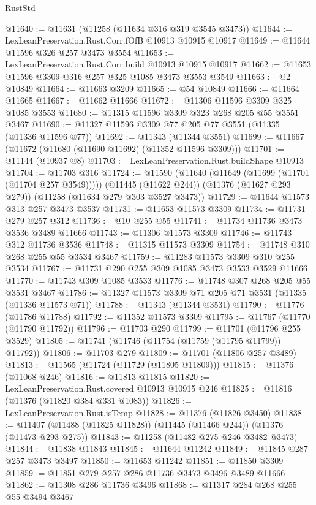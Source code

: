 \begin{lexlean}{RustStd}
\begin{coremodule}
{{{{{{{{{{{{{{{{{{{@11640 := @11631 (@11258 (@11634 @316 @319 @3545 @3473))
@11644 := LexLeanPreservation.Rust.Corr.fOfB @10913 @10915 @10917
@11649 := @11644 @11596 @326 @257 @3473 @3554
@11653 := LexLeanPreservation.Rust.Corr.build @10913 @10915 @10917
@11662 := @11653 @11596 @3309 @316 @257 @325 @1085 @3473 @3553 @3549
@11663 := @2 @10849
@11664 := @11663 @3209
@11665 := @54 @10849
@11666 := @11664 @11665
@11667 := @11662 @11666
@11672 := @11306 @11596 @3309 @325 @1085 @3553
@11680 := @11315 @11596 @3309 @323 @268 @205 @55 @3551 @3467
@11690 := @11327 @11596 @3309 @77 @205 @77 @3551 (@11335 (@11336 @11596 @77))
@11692 := @11343 (@11344 @3551)
@11699 := @11667 (@11672 (@11680 (@11690 @11692) (@11352 @11596 @3309)))
@11701 := @11144 (@10937 @8)
@11703 := LexLeanPreservation.Rust.buildShape @10913
@11704 := @11703 @316
@11724 := @11590
    (@11640 (@11649 (@11699 (@11701 (@11704 @257 @3549)))))
    (@11445 (@11622 @244))
    (@11376 (@11627 @293 @279))
    (@11258 (@11634 @279 @303 @3527 @3473))
@11729 := @11644 @11573 @313 @257 @3473 @3537
@11731 := @11653 @11573 @3309
@11734 := @11731 @279 @257 @312
@11736 := @10 @255 @55
@11741 := @11734 @11736 @3473 @3536 @3489 @11666
@11743 := @11306 @11573 @3309
@11746 := @11743 @312 @11736 @3536
@11748 := @11315 @11573 @3309
@11754 := @11748 @310 @268 @255 @55 @3534 @3467
@11759 := @11283 @11573 @3309 @310 @255 @3534
@11767 := @11731 @290 @255 @309 @1085 @3473 @3533 @3529 @11666
@11770 := @11743 @309 @1085 @3533
@11776 := @11748 @307 @268 @205 @55 @3531 @3467
@11786 := @11327 @11573 @3309 @71 @205 @71 @3531 (@11335 (@11336 @11573 @71))
@11788 := @11343 (@11344 @3531)
@11790 := @11776 (@11786 @11788)
@11792 := @11352 @11573 @3309
@11795 := @11767 (@11770 (@11790 @11792))
@11796 := @11703 @290
@11799 := @11701 (@11796 @255 @3529)
@11805 := @11741 (@11746 (@11754 (@11759 (@11795 @11799)) @11792))
@11806 := @11703 @279
@11809 := @11701 (@11806 @257 @3489)
@11813 := @11565 (@11724 (@11729 (@11805 @11809)))
@11815 := @11376 (@11068 @246)
@11816 := @11813 @11815
@11820 := LexLeanPreservation.Rust.covered @10913 @10915 @246
@11825 := @11816 (@11376 (@11820 @384 @331 @1083))
@11826 := LexLeanPreservation.Rust.isTemp
@11828 := @11376 (@11826 @3450)
@11838 := @11407 (@11488 (@11825 @11828)) (@11445 (@11466 @244)) (@11376 (@11473 @293 @275))
@11843 := @11258 (@11482 @275 @246 @3482 @3473)
@11844 := @11838 @11843
@11845 := @11644 @11242
@11849 := @11845 @287 @257 @3473 @3497
@11850 := @11653 @11242
@11851 := @11850 @3309
@11859 := @11851 @279 @257 @286 @11736 @3473 @3496 @3489 @11666
@11862 := @11308 @286 @11736 @3496
@11868 := @11317 @284 @268 @255 @55 @3494 @3467
}}}}}}}}}}}}}}}}}}}
\end{coremodule}
\end{lexlean}

